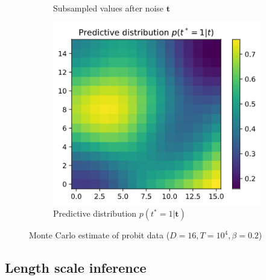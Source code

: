 \documentclass[]{article}
\newcommand{\tbold}{\boldsymbol{t}}
\begin{document}
\begin{figure}[!h]
\begin{subfigure}{0.32\linewidth}
		\caption{Subsampled values after noise $\tbold$}
		\label{fig:t-2d}
	\end{subfigure}
	\begin{subfigure}{0.32\linewidth}
		\includegraphics[width=\linewidth]{t-predictive.png}
		\caption{Predictive distribution $p(t^* = 1 | \tbold)$}
		\label{fig:t-predictive}
	\end{subfigure}
	\caption{Monte Carlo estimate of probit data ($D=16, T=10^4, \beta=0.2$)}
	\label{fig:t-estimate}
\end{figure}

\subsection{Length scale inference}
\end{document}

